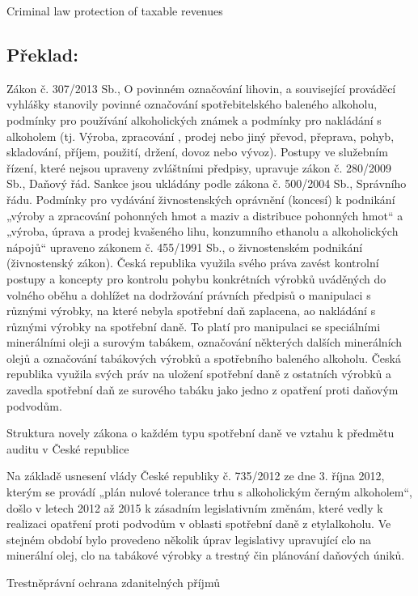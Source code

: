 \documentclass[10pt]{article}
\begin{document}
Criminal law protection of taxable revenues



\pagebreak

\subsection*{Překlad:}

Zákon č. 307/2013 Sb., O povinném označování lihovin, a související prováděcí vyhlášky stanovily povinné označování spotřebitelského baleného alkoholu, podmínky pro používání alkoholických známek a podmínky pro nakládání s alkoholem (tj. Výroba, zpracování , prodej nebo jiný převod, přeprava, pohyb, skladování, příjem, použití, držení, dovoz nebo vývoz).
Postupy ve služebním řízení, které nejsou upraveny zvláštními předpisy, upravuje zákon č. 280/2009 Sb., Daňový řád.
Sankce jsou ukládány podle zákona č. 500/2004 Sb., Správního řádu.
Podmínky pro vydávání živnostenských oprávnění (koncesí) k podnikání „výroby a zpracování pohonných hmot a maziv a distribuce pohonných hmot“ a „výroba, úprava a prodej kvašeného lihu, konzumního ethanolu a alkoholických nápojů“ upraveno zákonem č. 455/1991 Sb., o živnostenském podnikání (živnostenský zákon).
Česká republika využila svého práva zavést kontrolní postupy a koncepty pro kontrolu pohybu konkrétních výrobků uváděných do volného oběhu a dohlížet na dodržování právních předpisů o manipulaci s různými výrobky, na které nebyla spotřební daň zaplacena, ao nakládání s různými výrobky na spotřební daně.
To platí pro manipulaci se speciálními minerálními oleji a surovým tabákem, označování některých dalších minerálních olejů a označování tabákových výrobků a spotřebního baleného alkoholu.
Česká republika využila svých práv na uložení spotřební daně z ostatních výrobků a zavedla spotřební daň ze surového tabáku jako jedno z opatření proti daňovým podvodům.


Struktura novely zákona o každém typu spotřební daně ve vztahu k předmětu auditu v České republice

Na základě usnesení vlády České republiky č. 735/2012 ze dne 3. října 2012, kterým se provádí „plán nulové tolerance trhu s alkoholickým černým alkoholem“, došlo v letech 2012 až 2015 k zásadním legislativním změnám, které vedly k realizaci opatření proti podvodům v oblasti spotřební daně z etylalkoholu.
Ve stejném období bylo provedeno několik úprav legislativy upravující clo na minerální olej, clo na tabákové výrobky a trestný čin plánování daňových úniků.


Trestněprávní ochrana zdanitelných příjmů
\end{document}
